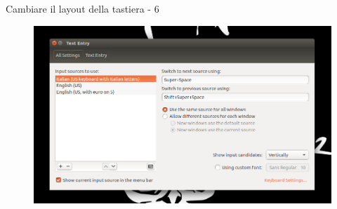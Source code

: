 \begin{frame}{Cambiare il layout della tastiera - 6}

\begin{figure}
\centering
\includegraphics[scale=0.31]{res/img/6}
\end{figure}

\end{frame}